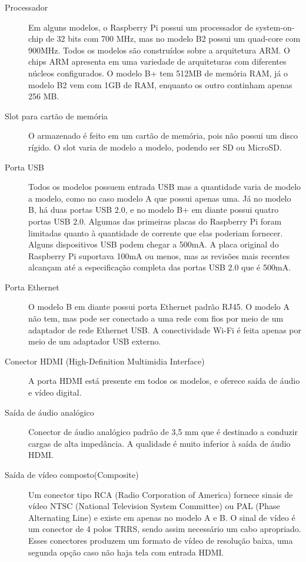 \documentclass[
	12pt,				%
	openright,			%
	twoside,			%
	a4paper,			%
	chapter=TITLE,		%
	english,			%
	brazil				%
	]{abntex2}
\begin{document}
\begin{description}

\item[Processador]
Em alguns modelos, o Raspberry Pi possui um processador de system-on-chip de 32 bits com 700 MHz, mas no modelo B2 possui um quad-core com 900MHz. Todos os modelos são construídos sobre a arquitetura ARM. O chips ARM apresenta em uma variedade de arquiteturas com diferentes núcleos configurados. O modelo B+ tem 512MB de memória RAM, já o modelo B2 vem com 1GB de RAM, enquanto os outro continham apenas 256 MB.
 
\item[Slot para cartão de memória]
O armazenado é feito em um cartão de memória, pois não possui um disco rígido. O slot  varia de modelo a modelo, podendo ser SD ou MicroSD.

\item[Porta USB]
Todos os modelos possuem entrada USB mas a quantidade varia de modelo a modelo, como no caso modelo A que possui apenas uma. Já no modelo B, há duas portas USB 2.0, e no modelo B+ em diante possui quatro portas USB 2.0. Algumas das primeiras placas do Raspberry Pi foram limitadas quanto à quantidade de corrente que elas poderiam fornecer. Alguns dispositivos USB podem chegar a 500mA. A placa original do Raspberry Pi suportava 100mA ou menos, mas as revisões mais recentes alcançam até a especificação completa das portas USB 2.0 que é 500mA.

\item[Porta Ethernet] 
O modelo B em diante possui porta Ethernet padrão RJ45. O modelo A não tem, mas pode ser conectado a uma rede com fios por meio de um adaptador de rede Ethernet USB. A conectividade Wi-Fi é feita apenas por meio de um adaptador USB externo.

\item[Conector HDMI (High-Definition Multimidia Interface)] 
A porta HDMI está presente em todos os modelos, e oferece saída de áudio e vídeo digital.

\item[Saída de áudio analógico]
Conector de áudio analógico padrão de 3,5 mm que é destinado a conduzir cargas de alta impedância. A qualidade é muito inferior à saída de áudio HDMI.

\item[Saída de vídeo composto(Composite)]
Um conector tipo RCA (Radio Corporation of America) fornece sinais de vídeo NTSC (National Television System Committee) ou PAL (Phase Alternating Line) e existe em apenas no modelo A e B. O sinal de vídeo é um conector de 4 polos TRRS, sendo assim necessário um cabo apropriado. Esses conectores produzem um formato de vídeo de resolução baixa, uma segunda opção caso não haja tela com entrada HDMI.


\end{description}
\end{document}
